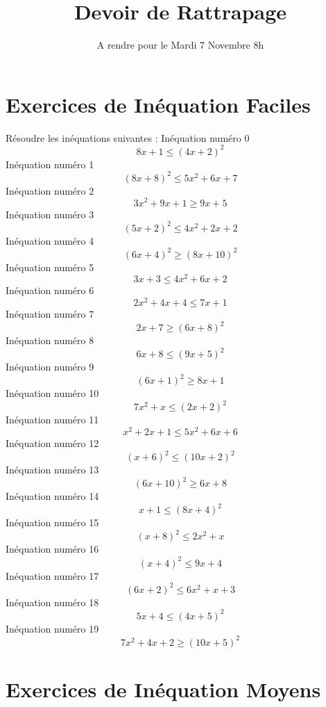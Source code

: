 \documentclass{article}
\title{Devoir de Rattrapage}
\date{A rendre pour le Mardi 7 Novembre 8h}\usepackage{natbib}
\begin{document}
\maketitle
 \section{Exercices de In\'equation Faciles}

 R\'esoudre les in\'equations suivantes : 
In\'equation num\'ero 0 \[8 x + 1 \leq \left(4 x + 2\right)^{2}\]In\'equation num\'ero 1 \[\left(8 x + 8\right)^{2} \leq 5 x^{2} + 6 x + 7\]In\'equation num\'ero 2 \[3 x^{2} + 9 x + 1 \geq 9 x + 5\]In\'equation num\'ero 3 \[\left(5 x + 2\right)^{2} \leq 4 x^{2} + 2 x + 2\]In\'equation num\'ero 4 \[\left(6 x + 4\right)^{2} \geq \left(8 x + 10\right)^{2}\]In\'equation num\'ero 5 \[3 x + 3 \leq 4 x^{2} + 6 x + 2\]In\'equation num\'ero 6 \[2 x^{2} + 4 x + 4 \leq 7 x + 1\]In\'equation num\'ero 7 \[2 x + 7 \geq \left(6 x + 8\right)^{2}\]In\'equation num\'ero 8 \[6 x + 8 \leq \left(9 x + 5\right)^{2}\]In\'equation num\'ero 9 \[\left(6 x + 1\right)^{2} \geq 8 x + 1\]In\'equation num\'ero 10 \[7 x^{2} + x \leq \left(2 x + 2\right)^{2}\]In\'equation num\'ero 11 \[x^{2} + 2 x + 1 \leq 5 x^{2} + 6 x + 6\]In\'equation num\'ero 12 \[\left(x + 6\right)^{2} \leq \left(10 x + 2\right)^{2}\]In\'equation num\'ero 13 \[\left(6 x + 10\right)^{2} \geq 6 x + 8\]In\'equation num\'ero 14 \[x + 1 \leq \left(8 x + 4\right)^{2}\]In\'equation num\'ero 15 \[\left(x + 8\right)^{2} \leq 2 x^{2} + x\]In\'equation num\'ero 16 \[\left(x + 4\right)^{2} \leq 9 x + 4\]In\'equation num\'ero 17 \[\left(6 x + 2\right)^{2} \leq 6 x^{2} + x + 3\]In\'equation num\'ero 18 \[5 x + 4 \leq \left(4 x + 5\right)^{2}\]In\'equation num\'ero 19 \[7 x^{2} + 4 x + 2 \geq \left(10 x + 5\right)^{2}\]
 \section{Exercices de In\'equation Moyens}
\end{document}
